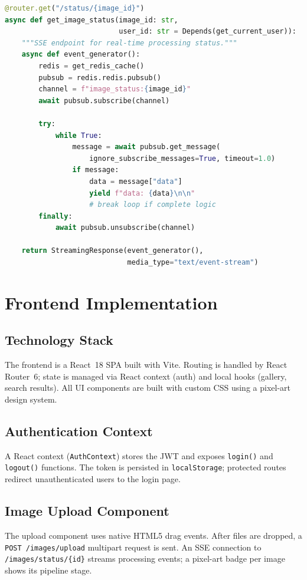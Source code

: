 \documentclass[12pt,a4paper,oneside]{report}
\begin{document}
\begin{lstlisting}[language=Python, caption={SSE processing-status
  endpoint (images router)}]
@router.get("/status/{image_id}")
async def get_image_status(image_id: str,
                           user_id: str = Depends(get_current_user)):
    """SSE endpoint for real-time processing status."""
    async def event_generator():
        redis = get_redis_cache()
        pubsub = redis.redis.pubsub()
        channel = f"image_status:{image_id}"
        await pubsub.subscribe(channel)

        try:
            while True:
                message = await pubsub.get_message(
                    ignore_subscribe_messages=True, timeout=1.0)
                if message:
                    data = message["data"]
                    yield f"data: {data}\n\n"
                    # break loop if complete logic
        finally:
            await pubsub.unsubscribe(channel)
            
    return StreamingResponse(event_generator(),
                             media_type="text/event-stream")
\end{lstlisting}

\section{Frontend Implementation}

\subsection{Technology Stack}
The frontend is a React~18 SPA built with Vite.  Routing is handled by
React Router~6; state is managed via React context (auth) and local hooks
(gallery, search results).  All UI components are built with custom CSS
using a pixel-art design system.

\subsection{Authentication Context}
A React context (\texttt{AuthContext}) stores the JWT and exposes
\texttt{login()} and \texttt{logout()} functions.  The token is
persisted in \texttt{localStorage}; protected routes redirect
unauthenticated users to the login page.

\subsection{Image Upload Component}
The upload component uses native HTML5 drag events.  After files are
dropped, a \texttt{POST /images/upload} multipart request is sent.
An SSE connection to \texttt{/images/status/\{id\}} streams processing
events; a pixel-art badge per image shows its pipeline stage.
\end{document}

